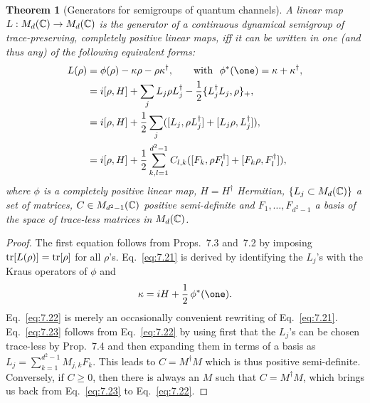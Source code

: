 \documentclass[11pt,a4paper]{article}
\theoremstyle{plain}
\newtheorem{theorem}{Theorem}
\begin{document}
\begin{theorem}[Generators for semigroups of quantum channels]
    A linear map $L:M_d(\mathbb{C})\to M_d(\mathbb{C})$ is the generator of a continuous dynamical semigroup of trace-preserving, completely positive linear maps, iff it can be written in one (and thus any) of the following equivalent forms:
    \begin{align}
        L(\rho)
         &= \phi(\rho) - \kappa\rho - \rho\kappa^{\dagger},
        \qquad\text{with }\ \phi^{*}(\one)=\kappa+\kappa^{\dagger}, \label{eq:7.20}\\
         &= i[\rho,H] + \sum_j L_j\rho L_j^{\dagger} - \frac12\{L_j^{\dagger}L_j,\rho\}_{+}, \label{eq:7.21}\\
         &= i[\rho,H] + \frac12\sum_j ([L_j,\rho L_j^{\dagger}] + [L_j\rho,L_j^{\dagger}]), \label{eq:7.22}\\
         &= i[\rho,H] + \frac12\sum_{k,l=1}^{d^2-1} C_{l,k}([F_k,\rho F_l^{\dagger}] + [F_k\rho,F_l^{\dagger}]), \label{eq:7.23}
    \end{align}
    where $\phi$ is a completely positive linear map, $H=H^{\dagger}$ Hermitian, $\{L_j\subset M_d(\mathbb{C})\}$ a set of matrices, $C\in M_{d^2-1}(\mathbb{C})$ positive semi-definite and $F_1,\ldots,F_{d^2-1}$ a basis of the space of trace-less matrices in $M_d(\mathbb{C})$.
\end{theorem}

\begin{proof}
    The first equation follows from Props.~7.3 and~7.2 by imposing $\operatorname{tr}[L(\rho)]=\operatorname{tr}[\rho]$ for all $\rho$'s. Eq.~\eqref{eq:7.21} is derived by identifying the $L_j$'s with the Kraus operators of $\phi$ and
    \begin{equation}\label{eq:7.24}
        \kappa = iH + \frac12\,\phi^{*}(\one).
    \end{equation}
    Eq.~\eqref{eq:7.22} is merely an occasionally convenient rewriting of Eq.~\eqref{eq:7.21}. Eq.~\eqref{eq:7.23} follows from Eq.~\eqref{eq:7.22} by using first that the $L_j$'s can be chosen trace-less by Prop.~7.4 and then expanding them in terms of a basis as $L_j=\sum_{k=1}^{d^2-1} M_{j,k}F_k$. This leads to $C=M^{\dagger}M$ which is thus positive semi-definite. Conversely, if $C\ge 0$, then there is always an $M$ such that $C=M^{\dagger}M$, which brings us back from Eq.~\eqref{eq:7.23} to Eq.~\eqref{eq:7.22}.
\end{proof}
\end{document}
